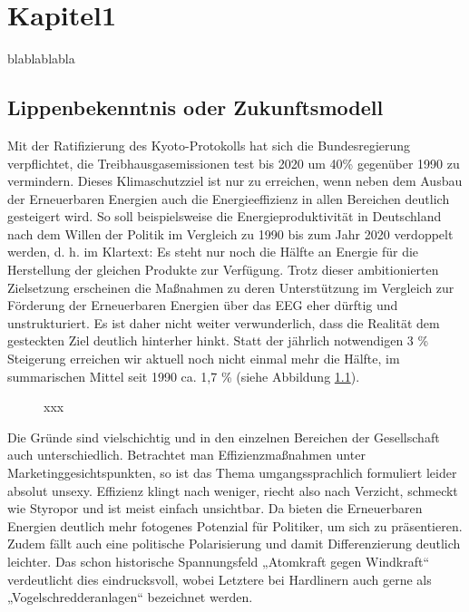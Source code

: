 \chapter{Kapitel1}
\label{cptr:Kapitel1}
blablablabla
\section{Lippenbekenntnis oder Zukunftsmodell}
\label{sctn:Lippenbekenntnis oder Zukunftsmodell}

Mit der Ratifizierung des Kyoto-Protokolls hat sich die Bundesregierung verpflichtet, die Treibhausgasemissionen test
bis 2020 um 40\% gegenüber 1990 zu vermindern. Dieses Klimaschutzziel ist
nur zu erreichen, wenn neben dem Ausbau der Erneuerbaren Energien auch die Energieeffizienz
in allen Bereichen deutlich gesteigert wird. So soll beispielsweise die Energieproduktivität
in Deutschland nach dem Willen der Politik im Vergleich zu 1990 bis zum Jahr 2020 verdoppelt
werden, d. h. im Klartext: Es steht nur noch die Hälfte an Energie für die Herstellung der gleichen
Produkte zur Verfügung. Trotz dieser ambitionierten Zielsetzung erscheinen die Maßnahmen
zu deren Unterstützung im Vergleich zur Förderung der Erneuerbaren Energien über das
EEG eher dürftig und unstrukturiert. Es ist daher nicht weiter verwunderlich, dass die Realität
dem gesteckten Ziel deutlich hinterher hinkt. Statt der jährlich notwendigen 3 \% Steigerung
erreichen wir aktuell noch nicht einmal mehr die Hälfte, im summarischen Mittel seit 1990
ca. 1,7 \% (siehe Abbildung \ref{fig:1}).\\

\begin{figure}[h]					%
	\centering
		\missingfigure{}			%
	\caption{xxx}
	\label{fig:1}
\end{figure}

Die Gründe sind vielschichtig und in den einzelnen Bereichen der Gesellschaft auch unterschiedlich. Betrachtet man Effizienzmaßnahmen unter Marketinggesichtspunkten, so ist das Thema umgangssprachlich formuliert leider absolut unsexy. Effizienz klingt nach weniger, riecht also nach Verzicht, schmeckt wie Styropor und ist meist einfach unsichtbar. Da bieten die Erneuerbaren Energien deutlich mehr fotogenes Potenzial für Politiker, um sich zu präsentieren. Zudem fällt auch eine politische Polarisierung und damit Differenzierung deutlich leichter. Das schon historische Spannungsfeld „Atomkraft gegen Windkraft“ verdeutlicht dies eindrucksvoll, wobei Letztere bei Hardlinern auch gerne als „Vogelschredderanlagen“ bezeichnet werden.

